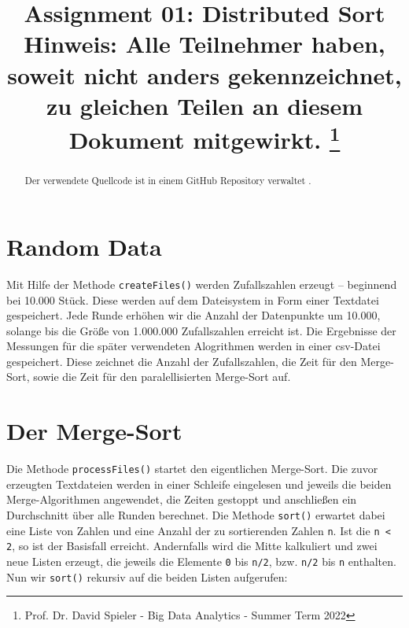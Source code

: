 \documentclass[conference]{IEEEtran}
\begin{document}
\title{Assignment 01: Distributed Sort\\
{\footnotesize Hinweis: Alle Teilnehmer haben, soweit nicht anders gekennzeichnet, zu gleichen Teilen an diesem Dokument mitgewirkt.}
\thanks{Prof. Dr. David Spieler - Big Data Analytics - Summer Term 2022}
}

\author{
\and
{}
\and
{}
}

\maketitle

\begin{abstract}
Der verwendete Quellcode ist in einem GitHub Repository verwaltet \cite{github}.
\end{abstract}

\section{Random Data}
Mit Hilfe der Methode \verb|createFiles()| werden Zufallszahlen erzeugt -- beginnend bei 10.000 Stück. Diese werden auf dem Dateisystem in Form einer Textdatei gespeichert. Jede Runde erhöhen wir die Anzahl der Datenpunkte um 10.000, solange bis die Größe von 1.000.000 Zufallszahlen erreicht ist. Die Ergebnisse der Messungen für die später verwendeten Alogrithmen werden in einer csv-Datei gespeichert. Diese zeichnet die Anzahl der Zufallszahlen, die Zeit für den Merge-Sort, sowie die Zeit für den paralellisierten Merge-Sort auf.

\section{Der Merge-Sort}
Die Methode \verb|processFiles()| startet den eigentlichen Merge-Sort. Die zuvor erzeugten Textdateien werden in einer Schleife eingelesen und jeweils die beiden Merge-Algorithmen angewendet, die Zeiten gestoppt und anschließen ein Durchschnitt über alle Runden berechnet. 
Die Methode \verb|sort()| erwartet dabei eine Liste von Zahlen und eine Anzahl der zu sortierenden Zahlen \verb|n|. Ist die \verb|n < 2|, so ist der Basisfall erreicht. Andernfalls wird die Mitte kalkuliert und zwei neue Listen erzeugt, die jeweils die Elemente \verb|0| bis \verb|n/2|, bzw. \verb|n/2| bis \verb|n| enthalten. Nun wir \verb|sort()| rekursiv auf die beiden Listen aufgerufen:
\end{document}

